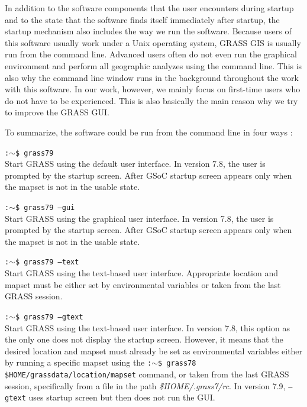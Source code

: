 \documentclass[a4paper,10pt,twoside]{article}
\begin{document}
\large \noindent In addition to the software components that the user
encounters during startup and to the state that the software finds
itself immediately after startup, the startup mechanism also includes
the way we run the software. Because users of this software usually
work under a Unix operating system, GRASS GIS is usually run from the
command line. Advanced users often do not even run the graphical
environment and perform all geographic analyzes using the command
line. This is also why the command line window runs in the background
throughout the work with this software. In our work, however, we
mainly focus on first-time users who do not have to be
experienced. This is also basically the main reason why we try to
improve the GRASS GUI.

 \noindent To summarize, the software could be run from the command line in four ways \cite{startup}:

\noindent \texttt{:$\sim$\$ grass79} \\
\noindent Start GRASS using the default user interface. In version
7.8, the user is prompted by the startup screen. After GSoC startup
screen appears only when the mapset is not in the usable state.

\noindent \texttt{:$\sim$\$ grass79 --gui}\\
\noindent Start GRASS using the graphical user interface.  In version
7.8, the user is prompted by the startup screen. After GSoC startup
screen appears only when the mapset is not in the usable state.

\noindent \texttt{:$\sim$\$ grass79 --text} \\
\noindent Start GRASS using the text-based user interface. Appropriate
location and mapset must be either set by environmental variables or
taken from the last GRASS session.

\noindent \texttt{:$\sim$\$ grass79 --gtext} \\
\noindent Start GRASS using the text-based user interface.  In version
7.8, this option as the only one does not display the startup
screen. However, it means that the desired location and mapset must
already be set as environmental variables either by running a specific
mapset using the \texttt{:$\sim$\$ grass78
  \$HOME/grassdata/location/mapset} command, or taken from the last
GRASS session, specifically from a file in the path
\textit{\$HOME/.grass7/rc}. In version 7.9, \texttt{--gtext} uses startup
screen but then does not run the GUI.
\end{document}
